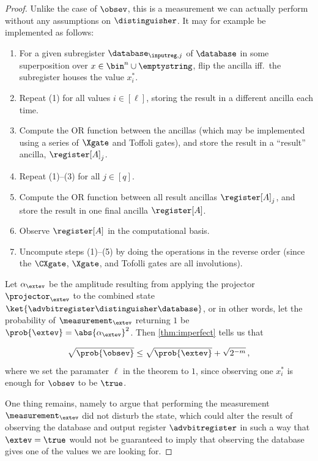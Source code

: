 \begin{proof}
        Unlike the case of $\obsev$, this is a measurement we can
          actually perform without any assumptions on $\distinguisher$.
          It may for example be implemented as follows:
        \begin{enumerate}
          \item For a given subregister $\database_{\inputreg,j}$ of $\database$
            in some superposition over $x \in \bin^n \cup \emptystring$, flip the ancilla
            iff.\ the subregister houses the value $x^*_i$.
          \item Repeat (1) for all values $i \in [\ell]$, storing the result in a different
            ancilla each time.
          \item Compute the OR function between the ancillas 
            (which may be implemented using a series of $\Xgate$ and Toffoli
            gates), and store the result in a ``result'' ancilla, $\register[A]_j$.
          \item Repeat (1)--(3) for all $j \in [q]$.
          \item Compute the OR function between all result ancillas $\register[A]_j$, and
            store the result in one final ancilla $\register[A]$.
          \item Observe $\register[A]$ in the computational basis.
          \item Uncompute steps (1)--(5) by doing the operations in the reverse
            order (since the $\CXgate$, $\Xgate$, and Tofolli gates are all involutions).
        \end{enumerate}

      \noindent
      Let $\alpha_\extev$ be the amplitude resulting from applying the projector
        $\projector_\extev$ to the combined state $\ket{\advbitregister
        \distinguisher \database}$, or in other words, let the probability of
        $\measurement_\extev$ returning $1$ be $\prob{\extev} =
        \abs{\alpha_\extev}^2$. Then \autoref{thm:imperfect} tells us that 

      \[
        \sqrt{\prob{\obsev}} \leq \sqrt{\prob{\extev}} + \sqrt{2^{-m}}\, ,
      \]
      where we set the paramater $\ell$ in the theorem to $1$, since
        observing one $x^*_i$ is enough for $\obsev$ to be $\true$.

      One thing remains, namely to argue that performing the measurement
        $\measurement_\extev$ did not disturb the state, which could alter the result of
        observing the database and output register $\advbitregister$ in such a
        way that $\extev = \true$ would not be guaranteed to imply that observing
        the database gives one of the values we are looking for.


\end{proof}
